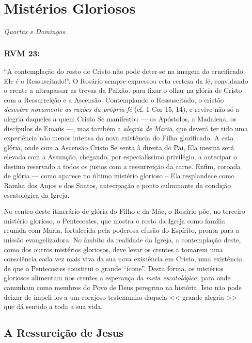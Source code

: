 \documentclass[10pt,a5paper]{book}
\newcommand{\from}[1]{\subsection*{#1}}
\begin{document}

\chapter{Mistérios Gloriosos}

\emph{Quartas e Domingos.}

\from{RVM 23:}

``A contemplação do rosto de Cristo não pode deter-se na imagem do crucificado.
Ele é o Ressuscitado!''.
O Rosário sempre expressou esta certeza da fé, convidando o crente a ultrapassar as trevas da Paixão, para fixar o olhar na glória de Cristo com a Ressurreição e a Ascensão.
Contemplando o Ressuscitado, o cristão \emph{descobre novamente as razões da própria fé} (cf. 1 Cor 15, 14), e revive não só a alegria daqueles a quem Cristo Se manifestou --- os Apóstolos,
a Madalena, os discípulos de Emaús ---, mas também a \emph{alegria de Maria}, que deverá ter tido uma experiência não menos intensa da nova existência do Filho glorificado.
A esta glória, onde com a Ascensão Cristo Se senta à direita do Pai, Ela mesma será elevada com a Assunção, chegando, por especialíssimo privilégio, a antecipar o destino reservado a todos os justos com a
ressurreição da carne.
Enfim, coroada de glória --- como aparece no último mistério glorioso -- Ela resplandece como Rainha dos Anjos e dos Santos, antecipação e ponto culminante da condição escatológica da Igreja.

No centro deste itinerário de glória do Filho e da Mãe, o Rosário põe, no terceiro mistério glorioso, o Pentecostes, que mostra o rosto da Igreja como família reunida com Maria, fortalecida pela poderosa efusão do Espírito, pronta para a missão evangelizadora.
No âmbito da realidade da Igreja, a contemplação deste, como dos outros mistérios gloriosos, deve levar os crentes a tomarem uma consciência cada vez mais viva da sua nova existência em Cristo, uma existência de que o Pentecostes constitui o grande ``ícone''.
Desta forma, os mistérios gloriosos alimentam nos crentes a esperança da \emph{meta escatológica}, para onde caminham como membros do Povo de Deus peregrino na história.
Isto não pode deixar de impeli-los a um corajoso testemunho daquela << grande alegria >> que dá sentido a toda a sua vida.


\section{A Ressureição de Jesus}
\end{document}
